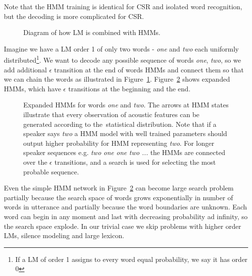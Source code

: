 {Note that the \ac{HMM} training is identical for \ac{CSR} and isolated word recognition,
but the decoding is more complicated for \ac{CSR}.

\begin{figure}[!htp]
    \begin{center}
        
        \caption{Diagram of how \ac{LM} is combined with \acp{HMM}.}
        \label{fig:hmm_lm} 
    \end{center}
\end{figure}

Imagine we have a \ac{LM} order 1 of only two words - {\it one}\/ and {\it two}\/ each uniformly distributed\footnote{
If a \ac{LM} of order 1 assigns to every word equal probability, we say it has order 0}.
We want to decode any possible sequence of words {\it one}, {\it two}, so 
we add additional $\epsilon$ transition at the end of words \acp{HMM}
and connect them so that we can chain the words as illustrated in Figure~\ref{fig:hmm_lm}.
Figure~\ref{fig:hmm_alt} shows expanded \acp{HMM}, which have $\epsilon$ transitions
at the beginning and the end. 


\begin{figure}[!htp]
    \begin{center}
        
        \caption{Expanded \acp{HMM} for words {\it one}\/ and {\it two}\/. 
        The arrows at \ac{HMM} states illustrate that every observation of acoustic features 
        can be generated according to the~statistical distribution. 
        Note that if a speaker says {\it two} a \ac{HMM} model with well trained parameters should output higher probability
        for \ac{HMM} representing {\it two}. For longer speaker sequences e.g. {\it two one one two ...} the \acp{HMM} are connected over the 
$\epsilon$ transitions, and a search is used for selecting the most probable sequence.}
        \label{fig:hmm_alt} 
    \end{center}
\end{figure}

Even the simple \ac{HMM} network in Figure~\ref{fig:hmm_alt} can become
large search problem partially because the search space of words grows
exponentially in number of words in utterance and partially
because the word boundaries are unknown. 
Each word can begin in any moment and last with decreasing probability ad infinity,
so the search space explode.
In our trivial case we skip problems with higher order \acp{LM}, silence modeling
and large lexicon.

}
